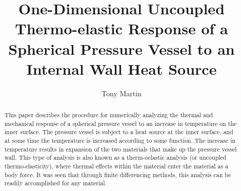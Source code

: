 \documentclass[times]{nmeauth}
\begin{document}

\title{One-Dimensional Uncoupled Thermo-elastic Response of a Spherical Pressure Vessel to an Internal Wall Heat Source}
\author{Tony Martin\corrauth{}}

\address{John Wiley \& Sons, Ltd, The Atrium, Southern Gate, Chichester,
West Sussex, PO19~8SQ, UK}


\begin{abstract}
This paper describes the procedure for numerically analyzing the thermal and mechanical response of a spherical pressure vessel to an increase in temperature on the inner surface. The pressure vessel is subject to a heat source at the inner surface, and at some time the temperature is increased according to some function. The increase in temperature results in expansion of the two materials that make up the pressure vessel wall. This type of analysis is also known as a therm-oelastic analysis (or uncoupled thermo-elasticity), where thermal effects within the material enter the material as a body force. It was seen that through finite differencing methods, this analysis can be readily accomplished for any material.  
\end{abstract}


\maketitle


\vspace{-6pt}
\end{document}
